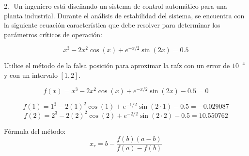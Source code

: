 \documentclass[12pt]{article}
\begin{document}
\begin{center}
\begin{tcolorbox}[title=Método de la bisección,
                  colback=white,
                  colframe=black,
                  breakable, enhanced]
\begin{lstlisting}[style=mypython]
\end{lstlisting}
\end{tcolorbox}


2.- Un ingeniero está diseñando un sistema de control automático para una planta industrial. Durante el análisis de estabilidad del sistema, se encuentra con la siguiente ecuación característica que debe resolver para determinar los parámetros críticos de operación:

\[ x^3-2x^2\cos(x)+e^{-x/2}\sin(2x)=0.5 \]


Utilice el método de la falsa posición para aproximar la raíz con un error de $10^{-4}$ y con un intervalo $[1,2]$.

\[ f(x)=x^3-2x^2\cos(x)+e^{-x/2}\sin(2x)-0.5=0 \]

\[ f(1)=1^3-2(1)^2\cos(1)+e^{-1/2}\sin(2\cdot1)-0.5=-0.029087 \]
\[ f(2)=2^3-2(2)^2\cos(2)+e^{-2/2}\sin(2\cdot2)-0.5=10.550762 \]

Fórmula del método:
\[ x_r = b - \frac{f(b)(a-b)}{f(a)-f(b)} \]

\vspace{0.5cm}


\end{center}
\end{document}
